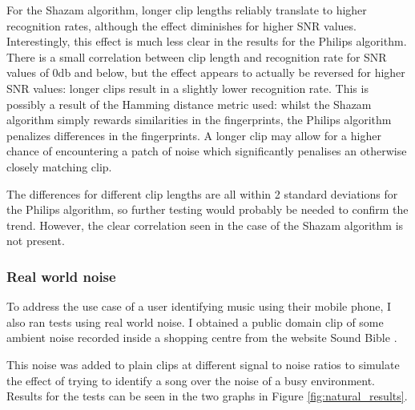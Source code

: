 \documentclass[12pt,a4paper,twoside,openright]{report}
\begin{document}
For the Shazam algorithm, longer clip lengths reliably translate to higher recognition rates, although the effect diminishes for higher SNR values. Interestingly, this effect is much less clear in the results for the Philips algorithm. There is a small correlation between clip length and recognition rate for SNR values of 0db and below, but the effect appears to actually be reversed for higher SNR values: longer clips result in a slightly lower recognition rate. This is possibly a result of the Hamming distance metric used: whilst the Shazam algorithm simply rewards similarities in the fingerprints, the Philips algorithm penalizes differences in the fingerprints. A longer clip may allow for a higher chance of encountering a patch of noise which significantly penalises an otherwise closely matching clip.

The differences for different clip lengths are all within 2 standard deviations for the Philips algorithm, so further testing would probably be needed to confirm the trend. However, the clear correlation seen in the case of the Shazam algorithm is not present.


\subsubsection{Real world noise}

To address the use case of a user identifying music using their mobile phone, I also ran tests using real world noise. I obtained a public domain clip of some ambient noise recorded inside a shopping centre from the website Sound Bible \cite{ShoppingAmbience}.

This noise was added to plain clips at different signal to noise ratios to simulate the effect of trying to identify a song over the noise of a busy environment. Results for the tests can be seen in the two graphs in Figure \ref{fig:natural_results}.
\end{document}
